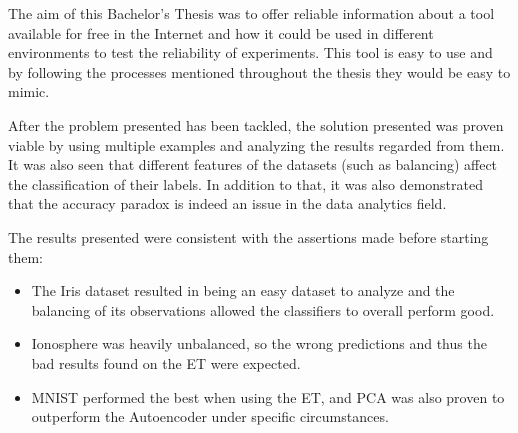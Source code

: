 

The aim of this Bachelor's Thesis was to offer reliable information about a tool available for free in the Internet and how it could be used in different environments to test the reliability of experiments. This tool is easy to use and by following the processes mentioned throughout the thesis they would be easy to mimic. \par

After the problem presented has been tackled, the solution presented was proven viable by using multiple examples and analyzing the results regarded from them. It was also seen that different features of the datasets (such as balancing) affect the classification of their labels. In addition to that, it was also demonstrated that the accuracy paradox is indeed an issue in the data analytics field.

The results presented were consistent with the assertions made before starting them:
\begin{itemize}
	\item The Iris dataset resulted in being an easy dataset to analyze and the balancing of its observations allowed the classifiers to overall perform good.
	
	\item Ionosphere was heavily unbalanced, so the wrong predictions and thus the bad results found on the ET were expected. 
	
	\item MNIST performed the best when using the ET, and PCA was also proven to outperform the Autoencoder  under specific circumstances.
	
\end{itemize}


